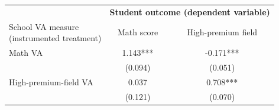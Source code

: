 \begin{tabular}{lcc}
\toprule
& \multicolumn{2}{c}{\textbf{Student outcome (dependent variable)}} \\
\cmidrule(lr){2-3}
\shortstack[l]{School VA measure\\(instrumented treatment)} & Math score & High-premium field \\
\midrule
Math VA & 1.143*** & -0.171*** \\
 & (0.094) & (0.051) \\
High-premium-field VA & 0.037 & 0.708*** \\
 & (0.121) & (0.070) \\
\bottomrule
\end{tabular}
